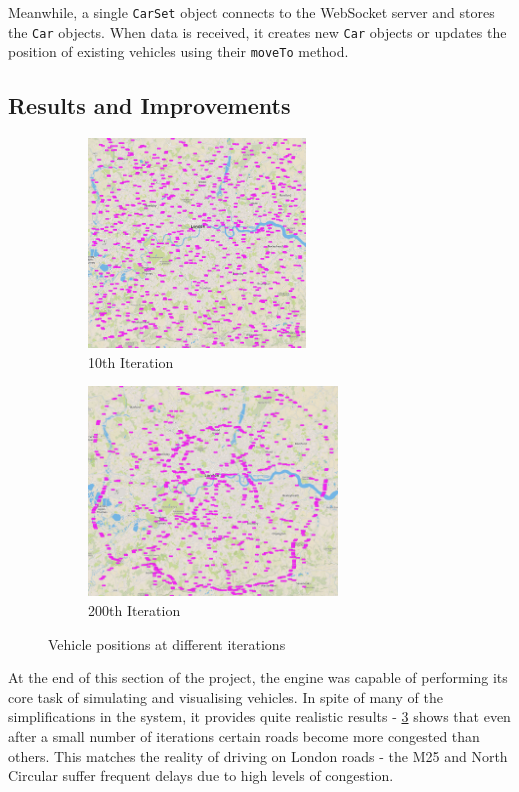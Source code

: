 \documentclass[ %
                    author={Alexander Hill},
                supervisor={Dr. Benjamin Sach},
                    degree={MEng},
                     title={MARMOSET},
                  subtitle={Multi-Agent Route Management using Online Simulation for Efficient Transportation},
                      type={research},
                      year={2016} ]{dissertation}
\begin{document}
Meanwhile, a single \texttt{CarSet} object connects to the WebSocket server and
stores the \texttt{Car} objects. When data is received, it creates new
\texttt{Car} objects or updates the position of existing vehicles using their
\texttt{moveTo} method.

\subsection{Results and Improvements}

\begin{figure}[h]
\centering
\begin{subfigure}[b]{0.4\textwidth}
    \centering
    \includegraphics[height=15em]{init-start}
    \caption{10th Iteration}\label{fig:init-start}
\end{subfigure}
\hspace{2em}
\begin{subfigure}[b]{0.4\textwidth}
    \centering
    \includegraphics[height=15em]{init-200}
    \caption{200th Iteration}\label{fig:init-200}
\end{subfigure}
\caption{Vehicle positions at different iterations}
\end{figure}

At the end of this section of the project, the engine was capable of performing
its core task of simulating and visualising vehicles. In spite of many of the
simplifications in the system, it provides quite realistic results -
\ref{fig:init-200} shows that even after a small number of iterations certain
roads become more congested than others. This matches the reality of driving on
London roads - the M25 and North Circular suffer frequent delays due to high
levels of congestion.
\end{document}
